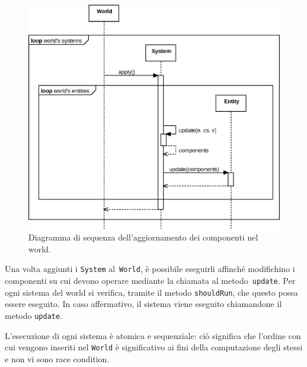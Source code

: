 \begin{figure}[H]
    \centering
    \includegraphics[width=\textwidth]{./img/Sequence}
    \caption{Diagramma di sequenza dell'aggiornamento dei componenti nel world.}\label{fig:sequence}
\end{figure}

Una volta aggiunti i \texttt{System} al~\texttt{World}, è possibile eseguirli affinché modifichino i componenti su cui
devono operare mediante la chiamata al metodo~\texttt{update}.
Per ogni sistema del world si verifica, tramite il metodo \texttt{shouldRun}, che questo possa essere eseguito.
In caso affermativo, il sistema viene eseguito chiamandone il metodo \texttt{update}.

L'esecuzione di ogni sistema è atomica e sequenziale: ciò significa che l'ordine con cui vengono inseriti nel
\texttt{World} è significativo ai fini della computazione degli stessi e non vi sono race condition.
